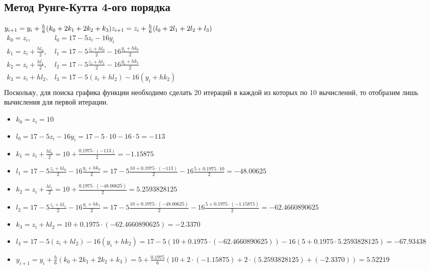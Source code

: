 \documentclass{article}
\begin{document}
\subsection{Метод Рунге-Кутта 4-ого порядка}
\begin{math}
  y_{i+1} = y_i + \frac{h}{6} (k_0 + 2k_1 + 2k_2 + k_3)\\
  z_{i+1} = z_i + \frac{h}{6} (l_0 + 2l_1 + 2l_2 + l_3)
\end{math} 
\\
\begin{math}
\begin{array}{rl}
  k_0 = z_i,                  & l_0 = 17 - 5z_i - 16y_i \\ 
  k_1 = z_i + \frac{hl_0}{2}, & l_1 = 17 - 5\frac{z_i + hl_0}{2} - 16\frac{y_i +  hk_0}{2} \\
  k_2 = z_i + \frac{hl_1}{2}, & l_2 = 17 - 5\frac{z_i + hl_1}{2} - 16\frac{y_i +  hk_1}{2} \\
  k_3 = z_i + hl_2,           & l_3 = 17 - 5(z_i + hl_2) - 16(y_i + hk_2)\\
\end{array}
\end{math} \\
Поскольку, для поиска графика функции необходимо сделать 20 итераций в каждой из
которых по 10 вычислений, то отобразим лишь вычисления для первой итерации.
\begin{itemize}
  \item $k_0 = z_i = 10$
  \item $l_0 = 17 - 5z_i - 16y_i  
  = 17 - 5 \cdot 10 - 16 \cdot 5 
  = -113$
  \item $k_1 = z_i + \frac{hl_0}{2} 
  = 10 + \frac{0.1975 \cdot (-113)}{2}
  =-1.15875$
  \item $l_1 = 17 - 5\frac{z_i + hl_0}{2} - 16\frac{y_i +  hk_0}{2}
  = 17 - 5\frac{10 + 0.1975\cdot (-113)}{2} - 16\frac{5 +  0.1975\cdot 10}{2} 
  = -48.00625$
  \item $k_2 = z_i + \frac{hl_1}{2} 
  = 10 + \frac{0.1975 \cdot (-48.00625)}{2} 
  = 5.2593828125$
  \item $l_2 = 17 - 5\frac{z_i + hl_1}{2} - 16\frac{y_i +  hk_1}{2} 
  = 17 - 5\frac{10 + 0.1975 \cdot (-48.00625)}{2} - 16\frac{5 +  0.1975 \cdot(-1.15875)}{2} 
  = -62.4660890625$
  \item $k_3 = z_i + hl_2 
  = 10 + 0.1975 \cdot (-62.4660890625) 
  = -2.3370$
  \item $l_3 = 17 - 5(z_i + hl_2) - 16(y_i + hk_2) 
  = 17 - 5(10 + 0.1975 \cdot (-62.4660890625)) - 16(5 + 0.1975 \cdot 5.2593828125) 
  = -67.93438$
  
  \item $y_{i+1} = y_i + \frac{h}{6} (k_0 + 2k_1 + 2k_2 + k_3)
  = 5 + \frac{ 0.1975}{6} (10 + 2\cdot (-1.15875) + 2\cdot (5.2593828125)  +(-2.3370)) 
  = 5.52219$
\end{itemize}
\end{document}
